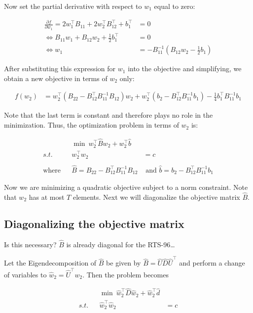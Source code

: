 \documentclass{article}
\begin{document}
Now set the partial derivative with respect to $w_1$ equal to zero:

\begin{align}
\nonumber \frac{\partial f}{\partial w_1} = 2w_1^\top B_{11} + 2w_2^\top B_{12}^\top + b_1^\top &= 0 \\
\nonumber \iff B_{11}w_1 + B_{12}w_2 + \frac{1}{2}b_1^\top &= 0 \\
\iff w_1 &= -B_{11}^{-1}\left(B_{12}w_2 - \frac{1}{2}b_1 \right)
\end{align}

After substituting this expression for $w_1$ into the objective and
simplifying, we obtain a new objective in terms of $w_2$ only:

\begin{align*}
f(w_2) &= w_2^\top\left(B_{22} - B_{12}^\top B_{11}^{-1} B_{12}\right)w_2 + 
w_2^\top (b_2 - B_{12}^\top B_{11}^{-1}b_1) - \frac{1}{4}b_1^\top B_{11}^{-1}b_1
\end{align*}

Note that the last term is constant and therefore plays no role in the
minimization. Thus, the optimization problem in terms of $w_2$ is:

\begin{align*}
&& \min~ w_2^\top \hat{B}w_2 + w_2^\top \hat{b} \\
s.t. && w_2^\top w_2 &= c \\ \nonumber\\
\text{where} && \hat{B} = B_{22} - B_{12}^\top B_{11}^{-1}B_{12} &\text{ and }\hat{b} = b_2 - B_{12}^\top B_{11}^{-1}b_1
\end{align*}

Now we are minimizing a quadratic objective subject to a norm
constraint. Note that $w_2$ has at most $T$ elements. Next we will
diagonalize the objective matrix $\hat{B}$.

    \subsection{Diagonalizing the objective
matrix}\label{diagonalizing-the-objective-matrix}

Is this necessary? $\hat{B}$ is already diagonal for the RTS-96\ldots{}

Let the Eigendecomposition of $\hat{B}$ be given by
$\hat{B} = \hat{U}\hat{D}\hat{U}^\top$ and perform a change of variables
to $\hat{w}_2 = \hat{U}^\top w_2$. Then the problem becomes

\begin{align*}
&& \min~ \hat{w}_2^\top \hat{D}\hat{w}_2 + \hat{w}_2^\top \hat{d} \\
s.t. && \hat{w}_2^\top \hat{w}_2 &= c
\end{align*}
\end{document}
